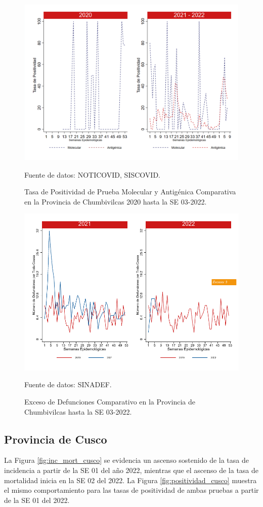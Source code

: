 \documentclass[12pt,a4paper,openany]{book}
\begin{document}
		\begin{figure}[h]
			\caption{Tasa de Positividad de Prueba Molecular y Antigénica Comparativa en la Provincia de Chumbivilcas 2020 hasta la SE 03-2022.}\label{fig:positividad_chumbivilcas}
			\begin{center}
				\includegraphics[width=0.7\linewidth]{../figuras/positividad_20_21_6.png}
			\end{center}
			{\footnotesize {Fuente de datos: NOTICOVID, SISCOVID.}}
		\end{figure}
		
		\begin{figure}[h]
			\caption{Exceso de Defunciones Comparativo en la Provincia de Chumbivilcas hasta la SE 03-2022.}\label{fig:exceso_chumbivilcas}
			\begin{center}
				\includegraphics[width=0.7\linewidth]{../figuras/exceso_6.pdf}
			\end{center}
			{\footnotesize {Fuente de datos: SINADEF.}}
		\end{figure}
		
		\clearpage
		
		\subsection*{Provincia de Cusco}
		\noindent La Figura \ref{fig:inc_mort_cusco} se evidencia un ascenso sostenido de la tasa de incidencia a partir de la SE 01 del año 2022, mientras que el ascenso de la tasa de mortalidad inicia en la SE 02 del 2022.   
		\noindent La  Figura \ref{fig:positividad_cusco} muestra el mismo comportamiento para las tasas de positividad de ambas pruebas a partir de la SE 01 del 2022. 
	
\end{document}
